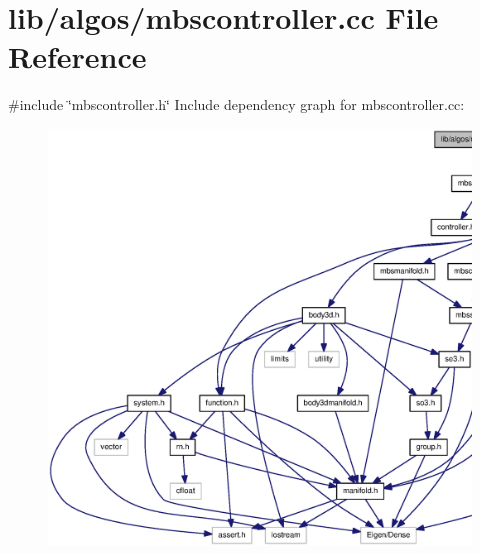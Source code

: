 \section{lib/algos/mbscontroller.cc \-File \-Reference}
\label{mbscontroller_8cc}
{\ttfamily \#include \char`\"{}mbscontroller.\-h\char`\"{}}\*
\-Include dependency graph for mbscontroller.\-cc\-:\nopagebreak
\begin{figure}[H]
\begin{center}
\leavevmode
\includegraphics[width=350pt]{mbscontroller_8cc__incl}
\end{center}
\end{figure}
